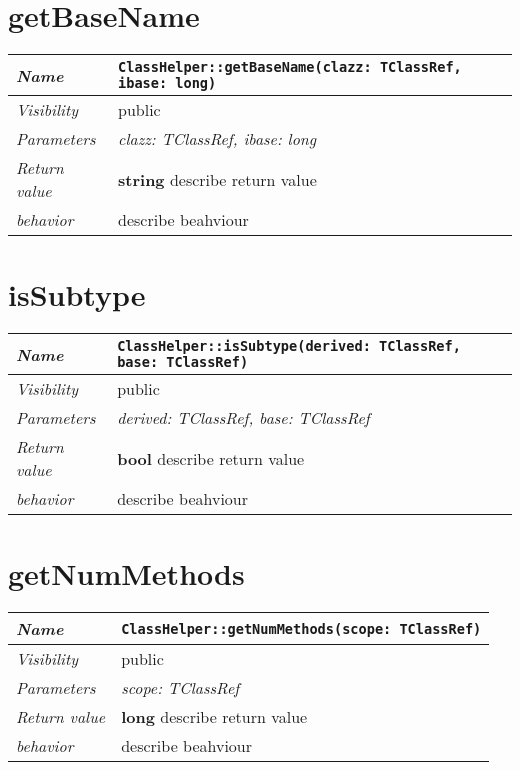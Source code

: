  \section{getBaseName}
\begin{longtable}{p{3cm} @{\hskip 1cm} p{12cm}}
 \hline
\textit{Name} & \texttt{ClassHelper::getBaseName(clazz: TClassRef, ibase: long)}\\
\hline
 \textit{Visibility} & public\\
\hline
\textit{Parameters} & \textit{clazz: TClassRef, ibase: long}\\
\hline
\textit{Return value} & \textbf{ string} describe return value\\
  \hline
 \textit{behavior} & describe beahviour \\
\hline
\end{longtable} \pagebreak
 \section{isSubtype}
\begin{longtable}{p{3cm} @{\hskip 1cm} p{12cm}}
 \hline
\textit{Name} & \texttt{ClassHelper::isSubtype(derived: TClassRef, base: TClassRef)}\\
\hline
 \textit{Visibility} & public\\
\hline
\textit{Parameters} & \textit{derived: TClassRef, base: TClassRef}\\
\hline
\textit{Return value} & \textbf{ bool} describe return value\\
  \hline
 \textit{behavior} & describe beahviour \\
\hline
\end{longtable} \pagebreak
 \section{getNumMethods}
\begin{longtable}{p{3cm} @{\hskip 1cm} p{12cm}}
 \hline
\textit{Name} & \texttt{ClassHelper::getNumMethods(scope: TClassRef)}\\
\hline
 \textit{Visibility} & public\\
\hline
\textit{Parameters} & \textit{scope: TClassRef}\\
\hline
\textit{Return value} & \textbf{ long} describe return value\\
  \hline
 \textit{behavior} & describe beahviour \\
\hline
\end{longtable} \pagebreak
